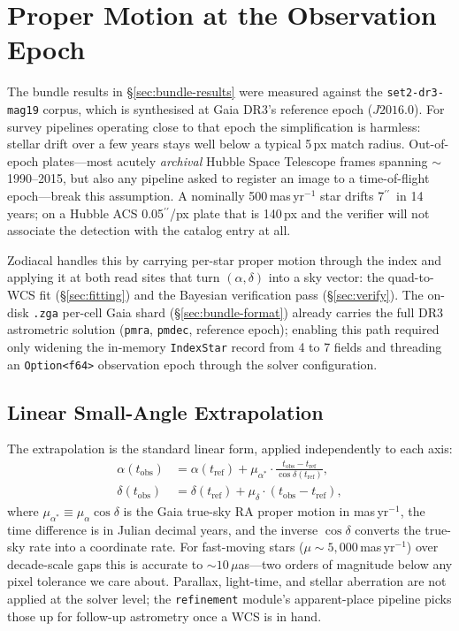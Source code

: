 \documentclass[twocolumn, 10pt]{article}
\newcommand{\arcsec}{\ensuremath{^{\prime\prime}}}
\begin{document}
\section{Proper Motion at the Observation Epoch} \label{sec:pm}

The bundle results in \S\ref{sec:bundle-results} were measured against
the \texttt{set2-dr3-mag19} corpus, which is synthesised at Gaia DR3's
reference epoch ($J2016.0$). For survey pipelines operating close to
that epoch the simplification is harmless: stellar drift over a few
years stays well below a typical 5\,px match radius. Out-of-epoch
plates---most acutely \emph{archival} Hubble Space Telescope frames
spanning $\sim$1990--2015, but also any pipeline asked to register an
image to a time-of-flight epoch---break this assumption. A nominally
500\,mas\,yr$^{-1}$ star drifts 7\arcsec\ in 14 years; on a Hubble ACS
0.05\arcsec/px plate that is 140\,px and the verifier will not
associate the detection with the catalog entry at all.

Zodiacal handles this by carrying per-star proper motion through the
index and applying it at both read sites that turn $(\alpha, \delta)$
into a sky vector: the quad-to-WCS fit
(\S\ref{sec:fitting}) and the Bayesian verification pass
(\S\ref{sec:verify}). The on-disk \texttt{.zga} per-cell Gaia shard
(\S\ref{sec:bundle-format}) already carries the full DR3 astrometric
solution (\texttt{pmra}, \texttt{pmdec}, reference epoch); enabling
this path required only widening the in-memory \texttt{IndexStar}
record from 4 to 7 fields and threading an \texttt{Option<f64>}
observation epoch through the solver configuration.

\subsection{Linear Small-Angle Extrapolation} \label{sec:pm-prop}

The extrapolation is the standard linear form, applied independently
to each axis:
\begin{align}
    \alpha(t_{\text{obs}}) &= \alpha(t_{\text{ref}})
        + \mu_{\alpha^*} \cdot \frac{t_{\text{obs}} - t_{\text{ref}}}
        {\cos \delta(t_{\text{ref}})}, \label{eq:pm-ra} \\
    \delta(t_{\text{obs}}) &= \delta(t_{\text{ref}})
        + \mu_{\delta} \cdot (t_{\text{obs}} - t_{\text{ref}}), \label{eq:pm-dec}
\end{align}
where $\mu_{\alpha^*} \equiv \mu_{\alpha} \cos \delta$ is the Gaia
true-sky RA proper motion in mas\,yr$^{-1}$, the time difference is in
Julian decimal years, and the inverse $\cos \delta$ converts the
true-sky rate into a coordinate rate. For fast-moving stars
($\mu \sim 5{,}000$\,mas\,yr$^{-1}$) over decade-scale gaps this is
accurate to $\sim 10\,\mu$as---two orders of magnitude below any
pixel tolerance we care about. Parallax, light-time, and stellar
aberration are not applied at the solver level; the \texttt{refinement}
module's apparent-place pipeline picks those up for follow-up
astrometry once a WCS is in hand.
\end{document}
